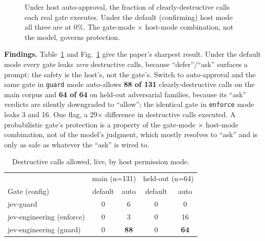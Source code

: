 \documentclass[conference]{IEEEtran}
\newcommand{\code}[1]{\texttt{\small #1}}
\begin{document}
\begin{figure}[t]
\centering
{}
\caption{Under host auto-approval, the fraction of clearly-destructive calls each real gate
executes. Under the default (confirming) host mode all three are at 0\%. The gate-mode
$\times$ host-mode combination, not the model, governs protection.}
\label{fig:live}
\end{figure}

\textbf{Findings.} Table~\ref{tab:live} and Fig.~\ref{fig:live} give the paper's sharpest
result. Under the default
mode every gate leaks \emph{zero} destructive calls, because ``defer''/``ask'' surfaces a
prompt: the safety is the host's, not the gate's. Switch to auto-approval and the same gate
in \code{guard} mode auto-allows \textbf{88 of 131} clearly-destructive calls on the main
corpus and \textbf{64 of 64} on held-out adversarial families, because its ``ask'' verdicts
are silently downgraded to ``allow''; the identical gate in \code{enforce} mode leaks 3 and
16. One flag, a 29$\times$ difference in destructive calls executed. A probabilistic gate's
protection is a property of the gate-mode $\times$ host-mode combination, not of the model's
judgment, which mostly resolves to ``ask'' and is only as safe as whatever the ``ask'' is
wired to.

\begin{table}[t]
\caption{Destructive calls allowed, live, by host permission mode.}
\label{tab:live}
\centering\small\setlength{\tabcolsep}{4.5pt}
\begin{tabular}{@{}lcccc@{}}
\toprule
 & \multicolumn{2}{c}{main (n=131)} & \multicolumn{2}{c}{held-out (n=64)} \\
Gate (config) & default & auto & default & auto \\
\midrule
jev-guard & 0 & 6 & 0 & 0 \\
jev-engineering (enforce) & 0 & 3 & 0 & 16 \\
jev-engineering (guard) & 0 & \textbf{88} & 0 & \textbf{64} \\
\bottomrule
\end{tabular}
\end{table}
\end{document}
